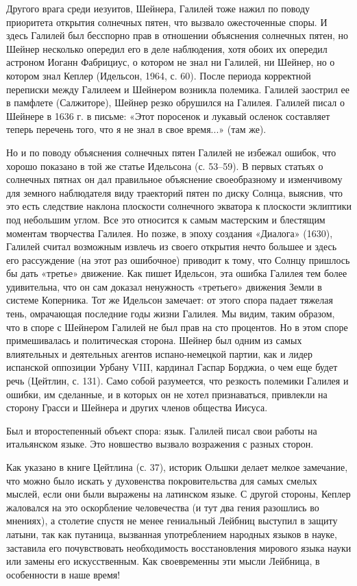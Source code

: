 Другого врага среди иезуитов, Шейнера, Галилей тоже нажил по поводу приоритета
открытия солнечных пятен, что вызвало ожесточенные споры. И здесь Галилей был
бесспорно прав в отношении объяснения солнечных пятен, но Шейнер несколько
опередил его в деле наблюдения, хотя обоих их опередил астроном Иоганн
Фабрициус, о котором не знал ни Галилей, ни Шейнер, но о котором знал Кеплер
(Идельсон, 1964, с. 60). После периода корректной переписки между Галилеем и
Шейнером возникла полемика. Галилей заострил ее в памфлете (Салжиторе), Шейнер
резко обрушился на Галилея. Галилей писал о Шейнере в 1636 г. в письме: «Этот
поросенок и лукавый осленок составляет теперь перечень того, что я не знал в
свое время...» (там же).

Но и по поводу объяснения солнечных пятен Галилей не избежал ошибок,
что хорошо показано в той же статье Идельсона (с. 53--59). В первых
статьях о солнечных пятнах он дал правильное объяснение своеобразному
и изменчивому для земного наблюдателя виду траекторий пятен по диску
Солнца, выяснив, что это есть следствие наклона плоскости солнечного
экватора к плоскости эклиптики под небольшим углом. Все это относится
к самым мастерским и блестящим моментам творчества Галилея. Но
позже, в эпоху создания «Диалога» (1630), Галилей считал возможным
извлечь из своего открытия нечто большее и здесь его рассуждение (на
этот раз ошибочное) приводит к тому, что Солнцу пришлось бы дать
«третье» движение. Как пишет Идельсон, эта ошибка Галилея тем более
удивительна, что он сам доказал ненужность «третьего» движения Земли в
системе Коперника. Тот же Идельсон замечает: от этого спора падает
тяжелая тень, омрачающая последние годы жизни Галилея. Мы видим, таким
образом, что в споре с Шейнером Галилей не был прав на сто процентов.
Но в этом споре примешивалась и политическая сторона. Шейнер был одним
из самых влиятельных и деятельных агентов испано-немецкой партии, как
и лидер испанской оппозиции Урбану VIII, кардинал Гаспар Борджиа, о
чем еще будет речь (Цейтлин, с. 131). Само собой разумеется, что
резкость полемики Галилея и ошибки, им сделанные, и в которых он
не хотел признаваться, привлекли на сторону Грасси и Шейнера и других членов
общества Иисуса.

Был и второстепенный объект спора: язык. Галилей писал свои работы на
итальянском языке. Это новшество вызвало возражения с разных сторон.

Как указано в книге Цейтлина (с. 37), историк Ольшки делает мелкое замечание,
что можно было искать у духовенства покровительства для самых смелых мыслей,
если они были выражены на латинском языке. С другой стороны, Кеплер жаловался
на это оскорбление человечества (и тут два гения разошлись во мнениях), а
столетие спустя не менее гениальный Лейбниц выступил в защиту латыни, так как
путаница, вызванная употреблением народных языков в науке, заставила его
почувствовать необходимость восстановления мирового языка науки или замены его
искусственным. Как своевременны эти мысли Лейбница, в особенности в наше время!

